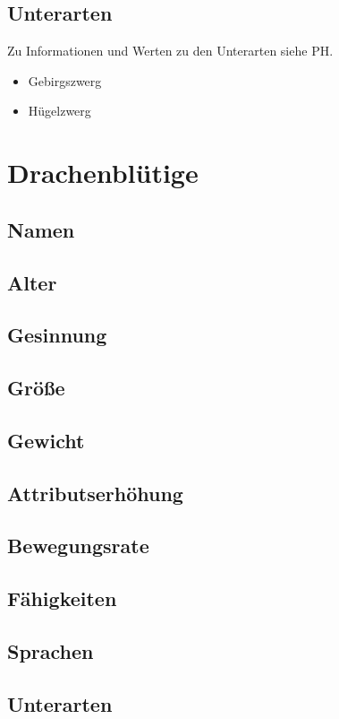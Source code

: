 \subsection*{Unterarten}
Zu Informationen und Werten zu den Unterarten siehe PH.
\begin{itemize}
	\item Gebirgszwerg
	\item Hügelzwerg
\end{itemize}

%

\newpage
\section{Drachenblütige}

\subsection*{Namen}
\subsection*{Alter}
\subsection*{Gesinnung}
\subsection*{Größe}
\subsection*{Gewicht}
\subsection*{Attributserhöhung}
\subsection*{Bewegungsrate}
\subsection*{Fähigkeiten}
\subsection*{Sprachen}
\subsection*{Unterarten}

